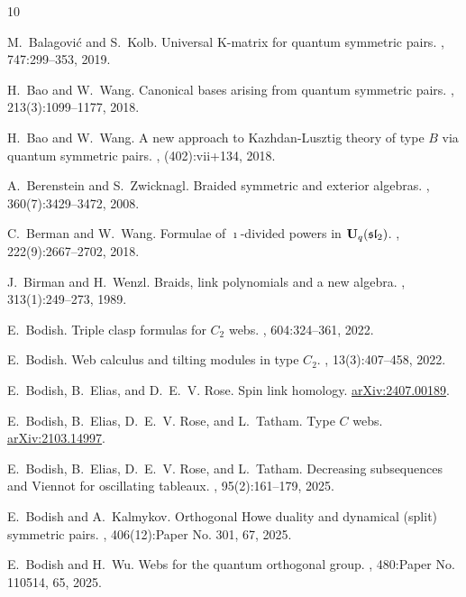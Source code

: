 \documentclass[10pt]{amsart}
\numberwithin{equation}{section}
\newcommand{\arxiv}[1]{\href{https://arxiv.org/abs/#1}{\small  arXiv:#1}}
\theoremstyle{definition}
\begin{document}
\begin{thebibliography}{10}

M.~Balagovi\'c and S.~Kolb.
\newblock Universal {K}-matrix for quantum symmetric pairs.
, 747:299--353, 2019.

H.~Bao and W.~Wang.
\newblock Canonical bases arising from quantum symmetric pairs.
, 213(3):1099--1177, 2018.

H.~Bao and W.~Wang.
\newblock A new approach to {K}azhdan-{L}usztig theory of type {$B$} via
  quantum symmetric pairs.
, (402):vii+134, 2018.

A.~Berenstein and S.~Zwicknagl.
\newblock Braided symmetric and exterior algebras.
, 360(7):3429--3472, 2008.

C.~Berman and W.~Wang.
\newblock Formulae of {$\imath$}-divided powers in
  {$\bold{U}_q(\mathfrak{sl}_2)$}.
, 222(9):2667--2702, 2018.

J.~Birman and H.~Wenzl.
\newblock Braids, link polynomials and a new algebra.
, 313(1):249--273, 1989.

E.~Bodish.
\newblock Triple clasp formulas for {$C_2$} webs.
, 604:324--361, 2022.

E.~Bodish.
\newblock Web calculus and tilting modules in type {$C_2$}.
, 13(3):407--458, 2022.

E.~Bodish, B.~Elias, and D.~E.~V. Rose.
\newblock Spin link homology.
\newblock \arxiv{2407.00189}.

E.~Bodish, B.~Elias, D.~E.~V. Rose, and L.~Tatham.
\newblock Type {$C$} webs.
\newblock \arxiv{2103.14997}.

E.~Bodish, B.~Elias, D.~E.~V. Rose, and L.~Tatham.
\newblock Decreasing subsequences and {V}iennot for oscillating tableaux.
, 95(2):161--179, 2025.

E.~Bodish and A.~Kalmykov.
\newblock Orthogonal {H}owe duality and dynamical (split) symmetric pairs.
, 406(12):Paper No. 301, 67, 2025.

E.~Bodish and H.~Wu.
\newblock Webs for the quantum orthogonal group.
, 480:Paper No. 110514, 65, 2025.


\end{thebibliography}
\end{document}
